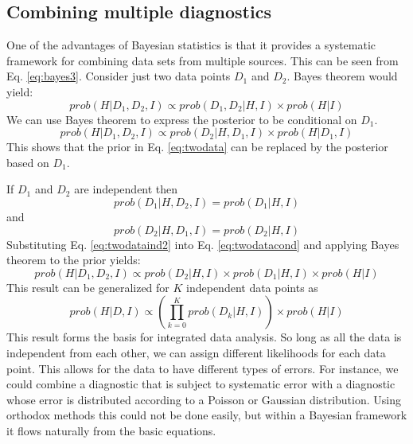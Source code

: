 \documentclass[12pt]{article}
\numberwithin{equation}{section}
\begin{document}
\subsection{Combining multiple diagnostics}
One of the advantages of Bayesian statistics is that it provides a systematic framework for combining data sets from multiple sources. This can be seen from Eq. \ref{eq:bayes3}. Consider just two data points $D_1$ and $D_2$. Bayes theorem would yield:
\begin{equation} \label{eq:twodata}
	prob(H|D_1,D_2,I) \propto prob(D_1,D_2|H,I) \times prob(H|I)
\end{equation}
We can use Bayes theorem to express the posterior to be conditional on $D_1$.
\begin{equation} \label{eq:twodatacond}
	prob(H|D_1,D_2,I) \propto prob(D_2|H,D_1,I) \times prob(H|D_1,I)
\end{equation}
This shows that the prior in Eq. \ref{eq:twodata} can be replaced by the posterior based on $D_1$. 

If $D_1$ and $D_2$ are independent then
\begin{equation} \label{eq:twodataind1}
	prob(D_1|H,D_2,I) = prob(D_1|H,I)
\end{equation}
and
\begin{equation} \label{eq:twodataind2}
	prob(D_2|H,D_1,I) = prob(D_2|H,I)
\end{equation}
Substituting Eq. \ref{eq:twodataind2} into Eq. \ref{eq:twodatacond} and applying Bayes theorem to the prior yields:
\begin{equation} \label{eq:twodataexpand}
	prob(H|D_1,D_2,I) \propto prob(D_2|H,I) \times prob(D_1|H,I) \times prob(H|I)
\end{equation}
This result can be generalized for $K$ independent data points as 
\begin{equation} \label{eq:IDA}
	{prob(H|D,I)} \propto {\left( \prod\limits_{k=0}^K{prob(D_k|H,I)}\right)} \times {prob(H|I)}
\end{equation}
This result forms the basis for integrated data analysis. So long as all the data is independent from each other, we can assign different likelihoods for each data point. This allows for the data to have different types of errors. For instance, we could combine a diagnostic that is subject to systematic error with a diagnostic whose error is distributed according to a Poisson or Gaussian distribution. Using orthodox methods this could not be done easily, but within a Bayesian framework it flows naturally from the basic equations. 
\end{document}
